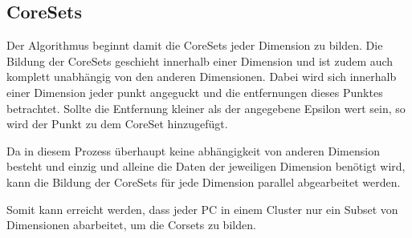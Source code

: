 \subsection{CoreSets}

Der Algorithmus beginnt damit die CoreSets jeder Dimension zu bilden. Die Bildung der CoreSets
geschieht innerhalb einer Dimension und ist zudem auch komplett unabhängig von den anderen
Dimensionen. Dabei wird sich innerhalb einer Dimension jeder punkt angeguckt und die entfernungen
dieses Punktes betrachtet. Sollte die Entfernung kleiner als der angegebene Epsilon wert sein, so
wird der Punkt zu dem CoreSet hinzugefügt.

Da in diesem Prozess überhaupt keine abhängigkeit von anderen Dimension besteht und einzig und
alleine die Daten der jeweiligen Dimension benötigt wird, kann die Bildung der CoreSets für jede
Dimension parallel abgearbeitet werden.

Somit kann erreicht werden, dass jeder PC in einem Cluster nur ein Subset von Dimensionen
abarbeitet, um die Corsets zu bilden.